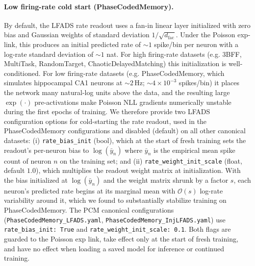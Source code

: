 \documentclass{article}
\begin{document}
\paragraph{Low firing-rate cold start (PhaseCodedMemory).}
By default, the LFADS rate readout uses a fan-in linear layer initialized with zero bias and Gaussian weights of standard deviation $1/\sqrt{d_{\text{fac}}}$. Under the Poisson exp-link, this produces an initial predicted rate of $\sim 1$ spike/bin per neuron with a log-rate standard deviation of $\sim 1$ nat. For high firing-rate datasets (e.g. 3BFF, MultiTask, RandomTarget, ChaoticDelayedMatching) this initialization is well-conditioned. For low firing-rate datasets (e.g. PhaseCodedMemory, which simulates hippocampal CA1 neurons at $\sim 2$\,Hz; $\sim 4\times 10^{-3}$ spikes/bin) it places the network many natural-log units above the data, and the resulting large $\exp(\cdot)$ pre-activations make Poisson NLL gradients numerically unstable during the first epochs of training. We therefore provide two LFADS configuration options for cold-starting the rate readout, used in the PhaseCodedMemory configurations and disabled (default) on all other canonical datasets: (i) \texttt{rate\_bias\_init} (bool), which at the start of fresh training sets the readout's per-neuron bias to $\log(\bar{y}_n)$ where $\bar{y}_n$ is the empirical mean spike count of neuron $n$ on the training set; and (ii) \texttt{rate\_weight\_init\_scale} (float, default $1.0$), which multiplies the readout weight matrix at initialization. With the bias initialized at $\log(\bar{y}_n)$ and the weight matrix shrunk by a factor $s$, each neuron's predicted rate begins at its marginal mean with $\mathcal{O}(s)$ log-rate variability around it, which we found to substantially stabilize training on PhaseCodedMemory. The PCM canonical configurations (\texttt{PhaseCodedMemory\_LFADS.yaml}, \texttt{PhaseCodedMemory\_InjLFADS.yaml}) use \texttt{rate\_bias\_init: True} and \texttt{rate\_weight\_init\_scale: 0.1}. Both flags are guarded to the Poisson exp link, take effect only at the start of fresh training, and have no effect when loading a saved model for inference or continued training.
\end{document}

